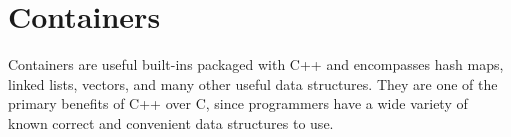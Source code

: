 \section{Containers}

Containers are useful built-ins packaged with C++ and encompasses
hash maps, linked lists, vectors, and many other useful data
structures. They are one of the primary benefits of C++ over C,
since programmers have a wide variety of known correct and
convenient data structures to use.